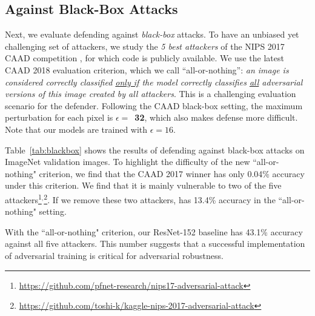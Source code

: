 \documentclass[10pt,twocolumn,letterpaper]{article}
\begin{document}
\subsection{Against Black-Box Attacks} 

Next, we evaluate defending against \emph{black-box} attacks.
To have an unbiased yet challenging set of attackers, we study the \emph{5 best attackers} of the NIPS 2017 CAAD competition \cite{Kurakin2018}, for which code is publicly available.
We use the latest CAAD 2018 evaluation criterion, which we call ``all-or-nothing'': \emph{an image is considered correctly classified \underline{only if} the model correctly classifies \underline{all} adversarial versions of this image created by all attackers}. This is a challenging evaluation scenario for the defender. Following the CAAD black-box setting, the maximum perturbation for each pixel is $\epsilon=$~\textbf{32}, which also makes defense more difficult. 
Note that our models are trained with $\epsilon=16$.

Table~\ref{tab:blackbox} shows the results of defending against black-box attacks on ImageNet validation images. 
To highlight the difficulty of the new ``all-or-nothing" criterion, we find that the CAAD 2017 winner \cite{Liao2018} has only 0.04\% accuracy under this criterion. We find that it is mainly vulnerable to two of the five attackers\footnote{\fontsize{6pt}{1em}\selectfont \url{https://github.com/pfnet-research/nips17-adversarial-attack}}$^{,}$\footnote{\fontsize{6pt}{1em}\url{https://github.com/toshi-k/kaggle-nips-2017-adversarial-attack}}. If we remove these two attackers, \cite{Liao2018} has 13.4\% accuracy in the ``all-or-nothing" setting.

With the ``all-or-nothing" criterion, our ResNet-152 baseline has 43.1\% accuracy against all five attackers. This number suggests that a successful implementation of adversarial training is critical for adversarial robustness. 
\end{document}

